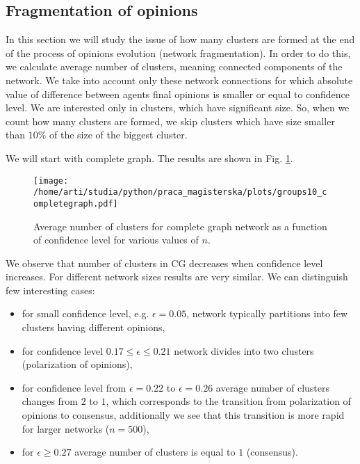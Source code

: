 \documentclass[a4paper, 12pt]{article}
\begin{document}
\subsection{Fragmentation of opinions}

In this section we will study the issue of how many clusters are formed at the end of the process of opinions evolution (network fragmentation). In order to do this, we calculate average number of clusters, meaning connected components of the network. We take into account only these network connections for which absolute value of difference between agents final opinions is smaller or equal to confidence level. We are interested only in clusters, which have significant size. So, when we count how many clusters are formed, we skip clusters which have size smaller than $10\%$ of the size of the biggest cluster.

\indent

We will start with complete graph. The results are shown in Fig. \ref{f26}.

\begin{figure}[H]
		\centering
		\texttt{[image: /home/arti/studia/python/praca\_magisterska/plots/groups10\_completegraph.pdf]}
		\caption{Average number of clusters for complete graph network as a function of confidence level for various values of $n$.}
		\label{f26}
\end{figure}

We observe that number of clusters in CG decreases when confidence level increases. For different network sizes results are very similar. We can distinguish few interesting cases:
\begin{itemize}
\item for small confidence level, e.g. $\epsilon = 0.05$, network typically partitions into few clusters having different opinions,
\item for confidence level $0.17 \leq \epsilon \leq 0.21$ network divides into two clusters (polarization of opinions),
\item for confidence level from $\epsilon = 0.22$ to $\epsilon = 0.26$ average number of clusters changes from $2$ to 	$1$, which corresponds to the transition from polarization of opinions to consensus, additionally we see that this transition is more rapid for larger networks ($n=500$),
\item for $\epsilon \geq 0.27$ average number of clusters is equal to $1$ (consensus).
\end{itemize} 
\end{document}
